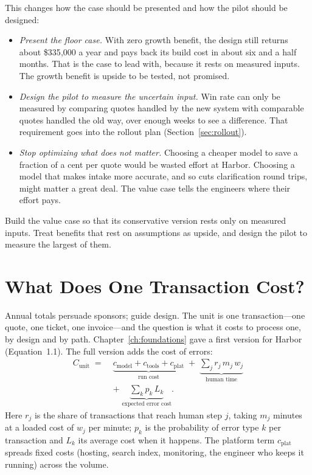 This changes how the case should be presented and how the pilot should be designed:
\begin{itemize}[itemsep=1pt]
  \item \emph{Present the floor case.} With zero growth benefit, the design still returns about \$335{,}000 a year and pays back its build cost in about six and a half months. That is the case to lead with, because it rests on measured inputs. The growth benefit is upside to be tested, not promised.
  \item \emph{Design the pilot to measure the uncertain input.} Win rate can only be measured by comparing quotes handled by the new system with comparable quotes handled the old way, over enough weeks to see a difference. That requirement goes into the rollout plan (Section~\ref{sec:rollout}).
  \item \emph{Stop optimizing what does not matter.} Choosing a cheaper model to save a fraction of a cent per quote would be wasted effort at Harbor. Choosing a model that makes intake more accurate, and so cuts clarification round trips, might matter a great deal. The value case tells the engineers where their effort pays.
\end{itemize}

\begin{principle}
Build the value case so that its conservative version rests only on measured inputs. Treat benefits that rest on assumptions as upside, and design the pilot to measure the largest of them.
\end{principle}

\section{What Does One Transaction Cost?}
\label{sec:unit-econ}

Annual totals persuade sponsors;  guide design. The unit is one transaction---one quote, one ticket, one invoice---and the question is what it costs to process one, by design and by path. Chapter~\ref{ch:foundations} gave a first version for Harbor (Equation~1.1). The full version adds the cost of errors:
\begin{equation}
  \begin{split}
  C_{\text{unit}} \;=\; & \underbrace{c_{\text{model}} + c_{\text{tools}} + c_{\text{plat}}}_{\text{run cost}}
  \;+\; \underbrace{\sum_{j} r_j \, m_j \, w_j}_{\text{human time}} \\
  & +\; \underbrace{\sum_{k} p_k \, L_k}_{\text{expected error cost}} .
  \end{split}
  \label{eq:unit}
\end{equation}
Here $r_j$ is the share of transactions that reach human step $j$, taking $m_j$ minutes at a loaded cost of $w_j$ per minute; $p_k$ is the probability of error type $k$ per transaction and $L_k$ its average cost when it happens. The platform term $c_{\text{plat}}$ spreads fixed costs (hosting, search index, monitoring, the engineer who keeps it running) across the volume.

